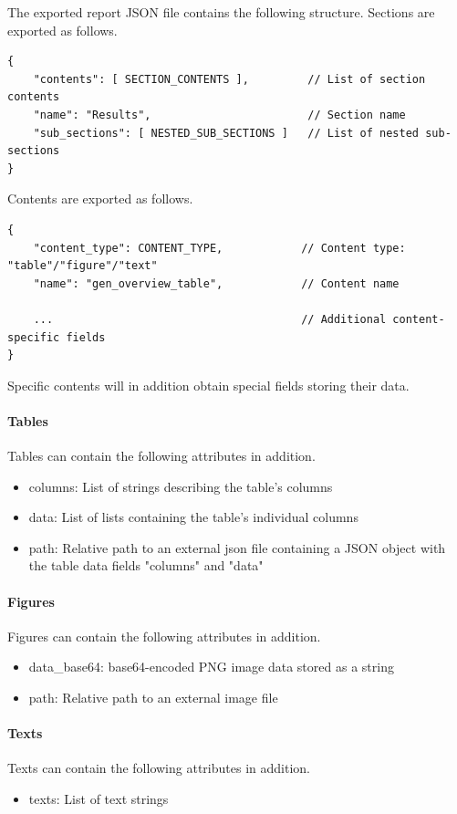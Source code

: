 The exported report JSON file contains the following structure. Sections are exported as follows.

\begin{lstlisting}[basicstyle=\small\ttfamily]
{
    "contents": [ SECTION_CONTENTS ],         // List of section contents
    "name": "Results",                        // Section name
    "sub_sections": [ NESTED_SUB_SECTIONS ]   // List of nested sub-sections
}
\end{lstlisting}

Contents are exported as follows.

\begin{lstlisting}[basicstyle=\small\ttfamily]
{
    "content_type": CONTENT_TYPE,            // Content type: "table"/"figure"/"text"
    "name": "gen_overview_table",            // Content name 
    
    ...                                      // Additional content-specific fields
}
\end{lstlisting}

Specific contents will in addition obtain special fields storing their data.

\paragraph{Tables} Tables can contain the following attributes in addition.

\begin{itemize}  
  \item columns: List of strings describing the table's columns
  \item data: List of lists containing the table's individual columns
  \item path: Relative path to an external json file containing a JSON object with the table data fields "columns" and "data"
\end{itemize}

\paragraph{Figures} Figures can contain the following attributes in addition.

\begin{itemize}  
  \item data\_base64: base64-encoded PNG image data stored as a string
  \item path: Relative path to an external image file
\end{itemize}

\paragraph{Texts} Texts can contain the following attributes in addition.

\begin{itemize}  
  \item texts: List of text strings
\end{itemize}
